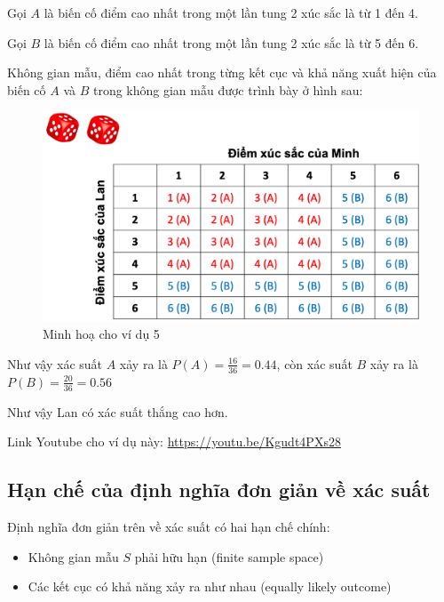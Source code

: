 \documentclass[
]{book}
\providecommand{\tightlist}{%
  \setlength{\itemsep}{0pt}\setlength{\parskip}{0pt}}
\begin{document}
Gọi \(A\) là biến cố điểm cao nhất trong một lần tung 2 xúc sắc là từ 1 đến 4.

Gọi \(B\) là biến cố điểm cao nhất trong một lần tung 2 xúc sắc là từ 5 đến 6.

Không gian mẫu, điểm cao nhất trong từng kết cục và khả năng xuất hiện của biến cố \(A\) và \(B\) trong không gian mẫu được trình bày ở hình sau:

\begin{figure}

{\centering \includegraphics[width=1\linewidth]{figures/Picture04} 

}

\caption{Minh hoạ cho ví dụ 5}\label{fig:example5}
\end{figure}

Như vậy xác suất \(A\) xảy ra là \(P(A) = \frac{16}{36} = 0.44\), còn xác suất \(B\) xảy ra là \(P(B) = \frac{20}{36} = 0.56\)

Như vậy Lan có xác suất thắng cao hơn.

Link Youtube cho ví dụ này: \url{https://youtu.be/Kgudt4PXs28}

\hypertarget{hux1ea1n-chux1ebf-cux1ee7a-ux111ux1ecbnh-nghux129a-ux111ux1a1n-giux1ea3n-vux1ec1-xuxe1c-suux1ea5t}{%
\subsection{Hạn chế của định nghĩa đơn giản về xác suất}\label{hux1ea1n-chux1ebf-cux1ee7a-ux111ux1ecbnh-nghux129a-ux111ux1a1n-giux1ea3n-vux1ec1-xuxe1c-suux1ea5t}}

Định nghĩa đơn giản trên về xác suất có hai hạn chế chính:

\begin{itemize}
\tightlist
\item
  Không gian mẫu \(S\) phải hữu hạn (finite sample space)
\item
  Các kết cục có khả năng xảy ra như nhau (equally likely outcome)
\end{itemize}
\end{document}
